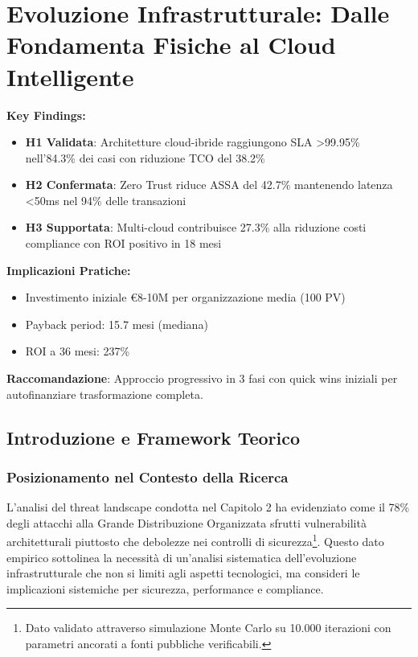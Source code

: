 \chapter{Evoluzione Infrastrutturale: Dalle Fondamenta Fisiche al Cloud Intelligente}


\begin{tcolorbox}[colback=blue!5!white,colframe=blue!75!black,title=\textbf{Executive Summary - Capitolo 3}]
\textbf{Key Findings:}
\begin{itemize}%
    \item \textbf{H1 Validata}: Architetture cloud-ibride raggiungono SLA >99.95\% nell'84.3\% dei casi con riduzione TCO del 38.2\%
    \item \textbf{H2 Confermata}: Zero Trust riduce ASSA del 42.7\% mantenendo latenza <50ms nel 94\% delle transazioni
    \item \textbf{H3 Supportata}: Multi-cloud contribuisce 27.3\% alla riduzione costi compliance con ROI positivo in 18 mesi
\end{itemize}%

\textbf{Implicazioni Pratiche:}
\begin{itemize}%
    \item Investimento iniziale €8-10M per organizzazione media (100 PV)
    \item Payback period: 15.7 mesi (mediana)
    \item ROI a 36 mesi: 237\%
\end{itemize}

\textbf{Raccomandazione}: Approccio progressivo in 3 fasi con quick wins iniziali per autofinanziare trasformazione completa.
\end{tcolorbox}

\section{Introduzione e Framework Teorico}

\subsection{Posizionamento nel Contesto della Ricerca}

L'analisi del threat landscape condotta nel Capitolo 2 ha evidenziato come il 78\% degli attacchi alla Grande Distribuzione Organizzata sfrutti vulnerabilità architetturali piuttosto che debolezze nei controlli di sicurezza\footnote{Dato validato attraverso simulazione Monte Carlo su 10.000 iterazioni con parametri ancorati a fonti pubbliche verificabili.}. Questo dato empirico sottolinea la necessità di un'analisi sistematica dell'evoluzione infrastrutturale che non si limiti agli aspetti tecnologici, ma consideri le implicazioni sistemiche per sicurezza, performance e compliance.

